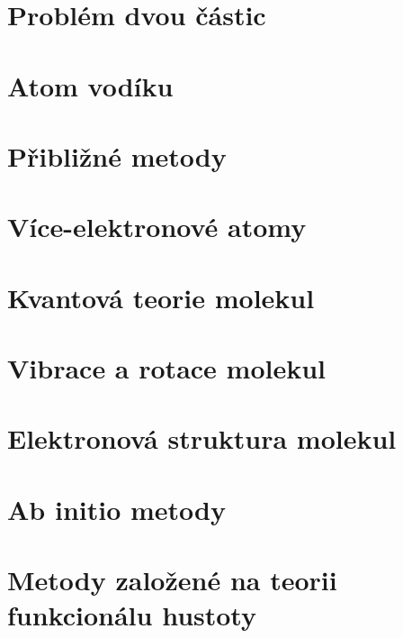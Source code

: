 \documentclass[a4paper,12pt]{article}
\numberwithin{equation}{section} %
\begin{document}
\clearpage
\section{Problém dvou částic}
\label{kap:dvecastice}


\clearpage
\section{Atom vodíku}
\label{kap:vodik}


\clearpage
\section{Přibližné metody}
\label{kap:pribliznemetody}


\clearpage
\section{Více-elektronové atomy}
\label{kap:viceelektron}


\clearpage
\section{Kvantová teorie molekul}
\label{kap:molekuly}


\clearpage
\section{Vibrace a rotace molekul}
\label{kap:vibrot}


\clearpage
\section{Elektronová struktura molekul}
\label{kap:elstruktmol}


\clearpage
\section{Ab initio metody}
\label{kap:abinitio}


\clearpage
\section{Metody založené na teorii funkcionálu hustoty}
\label{sec:dft}

\end{document}
